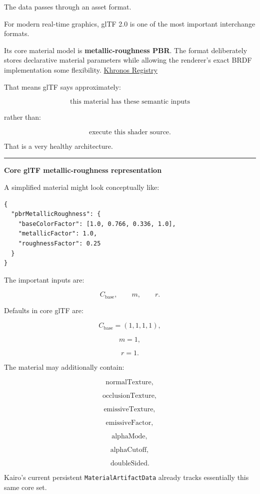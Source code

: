 The data passes through an asset format.

For modern real-time graphics, glTF 2.0 is one of the most important interchange formats.

Its core material model is \textbf{metallic-roughness PBR}. The format deliberately stores declarative material parameters while allowing the renderer's exact BRDF implementation some flexibility. \href{https://registry.khronos.org/glTF/specs/2.0/glTF-2.0.html?utm_source=chatgpt.com}{Khronos Registry}

That means glTF says approximately:

\[
\text{this material has these semantic inputs}
\]

rather than:

\[
\text{execute this shader source}.
\]

That is a very healthy architecture.

\begin{center}\rule{0.5\linewidth}{0.5pt}\end{center}

\textbf{Core glTF metallic-roughness representation}

A simplified material might look conceptually like:

\begin{verbatim}
{
  "pbrMetallicRoughness": {
    "baseColorFactor": [1.0, 0.766, 0.336, 1.0],
    "metallicFactor": 1.0,
    "roughnessFactor": 0.25
  }
}
\end{verbatim}

The important inputs are:

\[
C_{\text{base}},
\qquad
m,
\qquad
r.
\]

Defaults in core glTF are:

\[
C_{\text{base}}=(1,1,1,1),
\]

\[
m=1,
\]

\[
r=1.
\]

The material may additionally contain:

\[
\text{normalTexture},
\]

\[
\text{occlusionTexture},
\]

\[
\text{emissiveTexture},
\]

\[
\text{emissiveFactor},
\]

\[
\text{alphaMode},
\]

\[
\text{alphaCutoff},
\]

\[
\text{doubleSided}.
\]

Kairo's current persistent \texttt{MaterialArtifactData} already tracks essentially this same core set.

